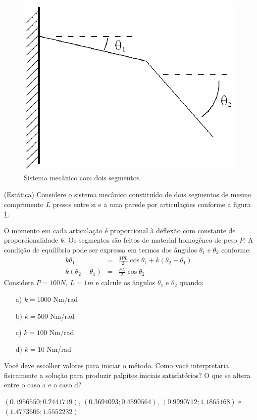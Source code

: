 \begin{figure}
        \centering
	    \includegraphics[width=.5\textwidth]{cap_nlinsis/pics/dois_segmentos}
		\caption{Sistema mecânico com dois segmentos.}
		\label{pic:dois_segmentos}
	\end{figure}

\begin{exer}{(Estática)}\label{prob:dois_segmentos} Considere o sistema mecânico constituído de dois segmentos de mesmo comprimento $L$ presos entre si e a uma parede por articulações conforme a figura \ref{pic:dois_segmentos}.

O momento em cada articulação é proporcional à deflexão com constante de proporcionalidade $k$. Os segmentos são feitos de material homogêneo de peso $P$. A condição de equilíbrio pode ser expressa em termos dos ângulos $\theta_1$ e $\theta_2$ conforme:
\begin{eqnarray*}
k\theta_1&=& \frac{3PL}{2}\cos\theta_1 + k\left(\theta_2-\theta_1\right)\\
k\left(\theta_2-\theta_1\right)&=& \frac{PL}{2}\cos\theta_2
\end{eqnarray*}
Considere $P=100N$, $L=1m$ e calcule os ângulos $\theta_1$ e $\theta_2$ quando:
\begin{itemize}
\item[a)] $k=1000$ Nm/rad
\item[b)] $k=500$ Nm/rad
\item[c)] $k=100$ Nm/rad
\item[d)] $k=10$ Nm/rad
\end{itemize}
Você deve escolher valores para iniciar o método. Como você interpretaria fisicamente a solução para produzir palpites iniciais satisfatórios? O que se altera entre o caso a e o caso d?
\end{exer}

\begin{resp}
$\left(0.1956550;0.2441719 \right)$, $\left(0.3694093;0.4590564\right) $, $\left( 0.9990712;1.1865168  \right)$ e $\left(1.4773606;1.5552232 \right)$
\end{resp}


